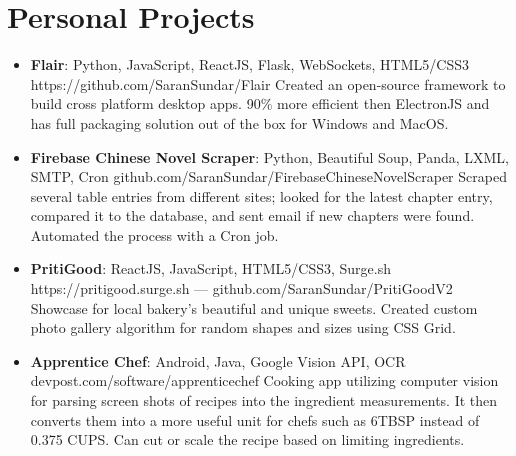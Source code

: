 \documentclass[letterpaper,11pt]{article}
\newcommand{\resumeItem}[2]{
  \item\small{
    \textbf{#1}{: #2 \vspace{-2pt}}
  }
}
\newcommand{\resumeSubItem}[2]{\resumeItem{#1}{#2}\vspace{-4pt}}
\newcommand{\resumeSubHeadingListStart}{\begin{itemize}[leftmargin=*]}
\newcommand{\resumeSubHeadingListEnd}{\end{itemize}}
\begin{document}
\section{Personal Projects}
  \resumeSubHeadingListStart
    \resumeSubItem{Flair}
      {Python, JavaScript, ReactJS, Flask, WebSockets, HTML5/CSS3
      \newline https://github.com/SaranSundar/Flair
      \newline Created an open-source framework to build cross platform desktop apps. 90\% more efficient then ElectronJS and has full packaging solution out of the box for Windows and MacOS.}
    \resumeSubItem{Firebase Chinese Novel Scraper}
      {Python, Beautiful Soup, Panda, LXML, SMTP, Cron
      \newline github.com/SaranSundar/FirebaseChineseNovelScraper
      \newline Scraped several table entries from different sites; looked for the latest chapter entry, compared it to the database, and sent email if new chapters were found. Automated the process with a Cron job.}
    \resumeSubItem{PritiGood}
      {ReactJS, JavaScript, HTML5/CSS3, Surge.sh
      \newline https://pritigood.surge.sh --- github.com/SaranSundar/PritiGoodV2
      \newline Showcase for local bakery's beautiful and unique sweets. Created custom photo gallery algorithm for random shapes and sizes using CSS Grid.}
    \resumeSubItem{Apprentice Chef}
        {Android, Java, Google Vision API, OCR
        \newline devpost.com/software/apprenticechef
        \newline Cooking app utilizing computer vision for parsing screen shots of recipes into the ingredient measurements. It then converts them into a more useful unit for chefs such as 6TBSP instead of 0.375 CUPS. Can cut or scale the recipe based on limiting ingredients.}
  \resumeSubHeadingListEnd
\end{document}
